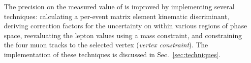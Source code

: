 The precision on the measured value of \mH is improved by implementing several techniques:
calculating a per-event matrix element kinematic discriminant,
deriving correction factors for the uncertainty on \mfourl within various regions of
phase space,
reevaluating the lepton \pt values using a \Zone mass constraint,
and constraining the four muon tracks to the selected vertex (\emph{vertex constraint}).
The implementation of these techniques is discussed in Sec.~\ref{sec:techniques}.



